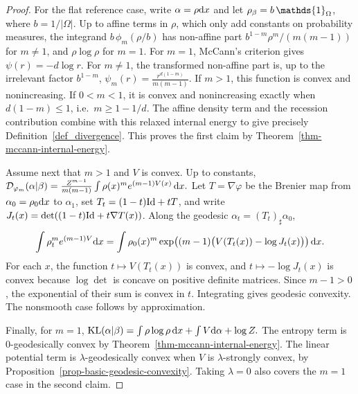 \begin{proof}
For the flat reference case, write \(\alpha=\rho\mathrm{d} x\) and let \(\density{\beta}=b\,\mathds{1}_\Omega\), where $b=1/|\Omega|$. Up to affine terms in \(\rho\), which only add constants on probability measures, the integrand \(b\,\phi_m(\rho/b)\) has non-affine part \(b^{1-m}\rho^m/(m(m-1))\) for \(m\neq1\), and \(\rho\log\rho\) for \(m=1\). For \(m=1\), McCann's criterion gives \(\psi(r)=-d\log r\). For \(m\neq1\), the transformed non-affine part is, up to the irrelevant factor \(b^{1-m}\),
\(\psi_m(r)=\frac{r^{d(1-m)}}{m(m-1)}\).
If \(m>1\), this function is convex and nonincreasing. If \(0<m<1\), it is convex and nonincreasing exactly when \(d(1-m)\leq1\), i.e.\ \(m\geq1-1/d\). The affine density term and the recession contribution combine with this relaxed internal energy to give precisely Definition~\ref{def_divergence}. This proves the first claim by Theorem~\ref{thm-mccann-internal-energy}.

Assume next that \(m>1\) and \(V\) is convex. Up to constants, \(\mathcal{D}_{\varphi_m}(\alpha|\beta) = \frac{Z^{m-1}}{m(m-1)} \int \rho(x)^m e^{(m-1)V(x)}\,\mathrm{d} x.\)
Let \(T=\nabla\varphi\) be the Brenier map from \(\alpha_0=\rho_0\mathrm{d} x\) to \(\alpha_1\), set \(T_t=(1-t)\mathrm{Id}+tT\), and write
\(J_t(x)=\det((1-t)\mathrm{Id}+t\nabla T(x))\). Along the geodesic \(\alpha_t=(T_t)_\sharp\alpha_0\),
\[
\int \rho_t^m e^{(m-1)V}\mathrm{d} x
=
\int \rho_0(x)^m
\exp\!\left((m-1)\big(V(T_t(x))-\log J_t(x)\big)\right)\mathrm{d} x.
\]
For each \(x\), the function \(t\mapsto V(T_t(x))\) is convex, and \(t\mapsto-\log J_t(x)\) is convex because \(\log\det\) is concave on positive definite matrices. Since \(m-1>0\), the exponential of their sum is convex in \(t\). Integrating gives geodesic convexity. The nonsmooth case follows by approximation.

Finally, for \(m=1\), \(\operatorname{KL}(\alpha|\beta) = \int \rho\log\rho\,\mathrm{d} x+\int V\mathrm{d}\alpha+\log Z.\)
The entropy term is \(0\)-geodesically convex by Theorem~\ref{thm-mccann-internal-energy}. The linear potential term is \(\lambda\)-geodesically convex when \(V\) is \(\lambda\)-strongly convex, by Proposition~\ref{prop-basic-geodesic-convexity}. Taking \(\lambda=0\) also covers the \(m=1\) case in the second claim.
\end{proof}
